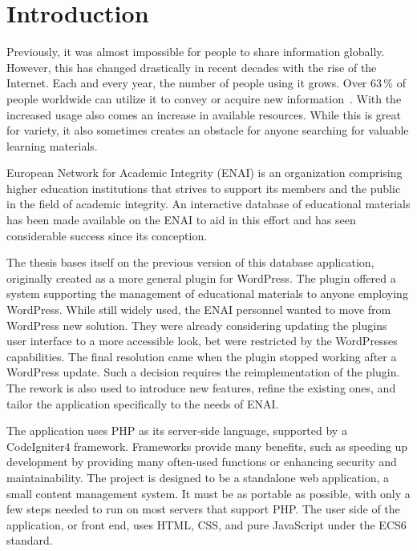 \documentclass[
  digital,     %
  oneside,     %
  nosansbold,  %
  colorbold, %
  lof,         %
  lot,         %
]{fithesis4}
\begin{document}
\chapter{Introduction}

Previously, it was almost impossible for people to share information globally.
However, this has changed drastically in recent decades with the rise of the
Internet. Each and every year, the number of people using it grows. Over
63\,\% of people worldwide can utilize it to convey or acquire new
information~\cite{w3_wordpress}. With the increased usage also comes
an increase in available resources. While this is great for variety, it also
sometimes creates an obstacle for anyone searching for valuable learning
materials.

European Network for Academic Integrity (ENAI) is an organization comprising
higher education institutions that strives to support its members and the public
in the field of academic integrity. An interactive database of educational
materials has been made available on the ENAI to aid in this effort and has seen
considerable success since its conception.

The thesis bases itself on the previous version of this database application,
originally created as a more general plugin for WordPress. The plugin offered
a system supporting the management of educational materials to anyone employing
WordPress. While still widely used, the ENAI personnel wanted to move from
WordPress new solution. They were already considering updating the plugins user
interface to a more accessible look, bet were restricted by the WordPresses capabilities.
The final resolution came when the plugin stopped working after a WordPress update.
Such a decision requires the reimplementation of the plugin. The rework is also used
to introduce new features, refine the existing ones, and tailor the application specifically
to the needs of ENAI.

The application uses PHP as its \mbox{server-side} language, supported by a CodeIgniter4
framework. Frameworks provide many benefits, such as speeding up development by
providing many \mbox{often-used} functions or enhancing security and maintainability.
The project is designed to be a standalone web application, a small content
management system. It must be as portable as possible, with only a few steps
needed to run on most servers that support PHP. The user side of the application,
or front end, uses HTML, CSS, and pure JavaScript under the ECS6 standard.
\end{document}
